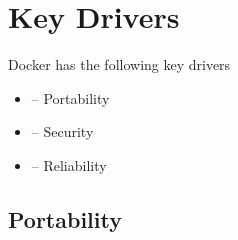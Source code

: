 
\section{Key Drivers}
\label{sec:keydrivers}


Docker has the following key drivers
\begin{itemize}
	\item {}-- Portability
	\item {}-- Security
	\item {}-- Reliability
\end{itemize}
%
\subsection{Portability}
%
%



